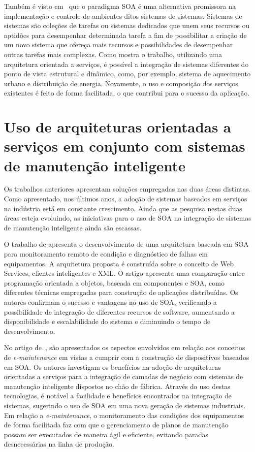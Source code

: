 Também é visto em~\cite{nagorny2013engineering} que o paradigma \gls{SOA} é uma alternativa
promissora na implementação e controle de ambientes ditos sistemas de sistemas. Sistemas de sistemas
são coleções de tarefas ou sistemas dedicados que unem seus recursos ou aptidões para desempenhar
determinada tarefa a fim de possibilitar a criação de um novo sistema que ofereça mais recursos e
possibilidades de desempenhar outras tarefas mais complexas. Como mostra o trabalho, utilizando uma
arquitetura orientada a serviços, é possível a integração de sistemas diferentes do ponto de vista
estrutural e dinâmico, como, por exemplo, sistema de aquecimento urbano e distribuição de energia.
Novamente, o uso e composição dos serviços existentes é feito de forma facilitada, o que contribui
para o sucesso da aplicação.


\section{Uso de arquiteturas orientadas a serviços em conjunto com sistemas de manutenção
inteligente}

Os trabalhos anteriores apresentam soluções empregadas nas duas áreas distintas. Como apresentado,
nos últimos anos, a adoção de sistemas baseados em serviços na indústria está em constante
crescimento. Ainda que as pesquisa nestas duas áreas esteja evoluindo, as iniciativas para o uso de
\gls{SOA} na integração de sistemas de manutenção inteligente ainda são escassas.

O trabalho de \cite{zhao2010soabased} apresenta o desenvolvimento de uma arquitetura baseada em
\gls{SOA} para monitoramento remoto de condição e diagnóstico de falhas em equipamentos. A
arquitetura proposta é construída sobre o conceito de Web Services, clientes inteligentes e
\gls{XML}. O artigo apresenta uma comparação entre programação orientada a objetos, baseada em
componentes e \gls{SOA}, como diferentes técnicas empregadas para construção de aplicações
distribuídas. Os autores confirmam o sucesso e vantagens no uso de \gls{SOA}, verificando a
possibilidade de integração de diferentes recursos de software, aumentando a disponibilidade e
escalabilidade do sistema e diminuindo o tempo de desenvolvimento.

No artigo de~\cite{cannata2010dynamic}, são apresentados os aspectos envolvidos em relação aos
conceitos de \textit{e-maintenance} em vistas a cumprir com a construção de dispositivos baseados em
\gls{SOA}. Os autores investigam os benefícios na adoção de arquiteturas orientadas a serviços para
a integração de camadas de negócio com sistemas de manutenção inteligente dispostos no chão de
fábrica. Através do uso destas tecnologias, é notável a facilidade e benefícios encontrados na
integração de sistemas, sugerindo o uso de \gls{SOA} em uma nova geração de sistemas industriais. Em
relação a \textit{e-maintenance}, o monitoramento das condições dos equipamentos de forma facilitada
faz com que o gerenciamento de planos de manutenção possam ser executados de maneira ágil e
eficiente, evitando paradas desnecessárias na linha de produção.
